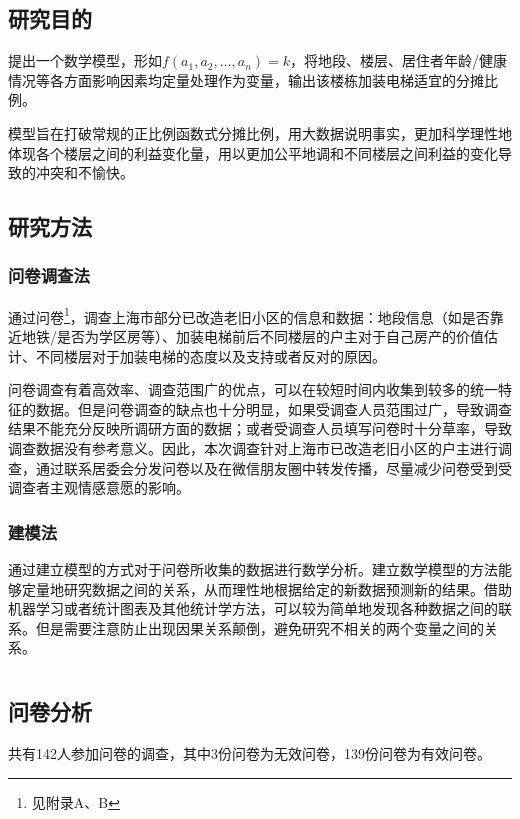 \documentclass[lang=cn,a4paper]{elegantpaper}
\begin{document}
    \subsection{研究目的}
    提出一个数学模型，形如$f(a_1,a_2,\dots,a_n)=k$，将地段、楼层、居住者年龄/健康情况等各方面影响因素均定量处理作为变量，输出该楼栋加装电梯适宜的分摊比例。

    模型旨在打破常规的正比例函数式分摊比例，用大数据说明事实，更加科学理性地体现各个楼层之间的利益变化量，用以更加公平地调和不同楼层之间利益的变化导致的冲突和不愉快。
    \subsection{研究方法}

    \subsubsection{问卷调查法}
    通过问卷\footnote{见附录A、B}，调查上海市部分已改造老旧小区的信息和数据：地段信息（如是否靠近地铁/是否为学区房等）、加装电梯前后不同楼层的户主对于自己房产的价值估计、不同楼层对于加装电梯的态度以及支持或者反对的原因。

    问卷调查有着高效率、调查范围广的优点，可以在较短时间内收集到较多的统一特征的数据。但是问卷调查的缺点也十分明显，如果受调查人员范围过广，导致调查结果不能充分反映所调研方面的数据；或者受调查人员填写问卷时十分草率，导致调查数据没有参考意义。因此，本次调查针对上海市已改造老旧小区的户主进行调查，通过联系居委会分发问卷以及在微信朋友圈中转发传播，尽量减少问卷受到受调查者主观情感意愿的影响。

    \subsubsection{建模法}
    通过建立模型的方式对于问卷所收集的数据进行数学分析。建立数学模型的方法能够定量地研究数据之间的关系，从而理性地根据给定的新数据预测新的结果。借助机器学习或者统计图表及其他统计学方法，可以较为简单地发现各种数据之间的联系。但是需要注意防止出现因果关系颠倒，避免研究不相关的两个变量之间的关系。

    \section{}
    \subsection{问卷分析}
    共有142人参加问卷的调查，其中3份问卷为无效问卷，139份问卷为有效问卷。
    
\end{document}
